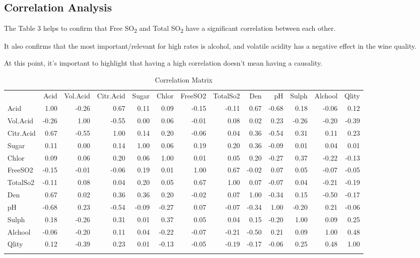 \documentclass[]{article}
\begin{document}
\subsection{Correlation Analysis}\label{correlation-analysis}

The Table 3 helps to confirm that Free SO\textsubscript{2} and Total
SO\textsubscript{2} have a significant correlation between each other.

It also confirms that the most important/relevant for high rates is
alcohol, and volatile acidity has a negative effect in the wine quality.

At this point, it's important to highlight that having a high
correlation doesn't mean having a causality.

\begin{longtable}[c]{@{}lrrrrrrrrrrrr@{}}
\toprule\addlinespace
& Acid & Vol.Acid & Citr.Acid & Sugar & Chlor & FreeSO2 & TotalSo2 & Den
& pH & Sulph & Alchool & Qlity
\\\addlinespace
\midrule\endhead
Acid & 1.00 & -0.26 & 0.67 & 0.11 & 0.09 & -0.15 & -0.11 & 0.67 & -0.68
& 0.18 & -0.06 & 0.12
\\\addlinespace
Vol.Acid & -0.26 & 1.00 & -0.55 & 0.00 & 0.06 & -0.01 & 0.08 & 0.02 &
0.23 & -0.26 & -0.20 & -0.39
\\\addlinespace
Citr.Acid & 0.67 & -0.55 & 1.00 & 0.14 & 0.20 & -0.06 & 0.04 & 0.36 &
-0.54 & 0.31 & 0.11 & 0.23
\\\addlinespace
Sugar & 0.11 & 0.00 & 0.14 & 1.00 & 0.06 & 0.19 & 0.20 & 0.36 & -0.09 &
0.01 & 0.04 & 0.01
\\\addlinespace
Chlor & 0.09 & 0.06 & 0.20 & 0.06 & 1.00 & 0.01 & 0.05 & 0.20 & -0.27 &
0.37 & -0.22 & -0.13
\\\addlinespace
FreeSO2 & -0.15 & -0.01 & -0.06 & 0.19 & 0.01 & 1.00 & 0.67 & -0.02 &
0.07 & 0.05 & -0.07 & -0.05
\\\addlinespace
TotalSo2 & -0.11 & 0.08 & 0.04 & 0.20 & 0.05 & 0.67 & 1.00 & 0.07 &
-0.07 & 0.04 & -0.21 & -0.19
\\\addlinespace
Den & 0.67 & 0.02 & 0.36 & 0.36 & 0.20 & -0.02 & 0.07 & 1.00 & -0.34 &
0.15 & -0.50 & -0.17
\\\addlinespace
pH & -0.68 & 0.23 & -0.54 & -0.09 & -0.27 & 0.07 & -0.07 & -0.34 & 1.00
& -0.20 & 0.21 & -0.06
\\\addlinespace
Sulph & 0.18 & -0.26 & 0.31 & 0.01 & 0.37 & 0.05 & 0.04 & 0.15 & -0.20 &
1.00 & 0.09 & 0.25
\\\addlinespace
Alchool & -0.06 & -0.20 & 0.11 & 0.04 & -0.22 & -0.07 & -0.21 & -0.50 &
0.21 & 0.09 & 1.00 & 0.48
\\\addlinespace
Qlity & 0.12 & -0.39 & 0.23 & 0.01 & -0.13 & -0.05 & -0.19 & -0.17 &
-0.06 & 0.25 & 0.48 & 1.00
\\\addlinespace
\bottomrule
\addlinespace
\caption{Correlation Matrix}
\end{longtable}
\end{document}
